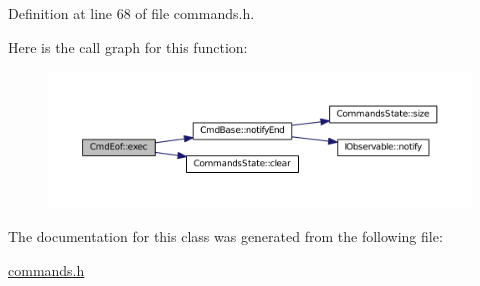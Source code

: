 Definition at line 68 of file commands.\+h.



Here is the call graph for this function\+:
\nopagebreak
\begin{figure}[H]
\begin{center}
\leavevmode
\includegraphics[width=350pt]{class_cmd_eof_a8435f64f04c88623fb29168ebf883e0d_cgraph}
\end{center}
\end{figure}




The documentation for this class was generated from the following file\+:\begin{DoxyCompactItemize}
\item 
\hyperlink{commands_8h}{commands.\+h}\end{DoxyCompactItemize}
